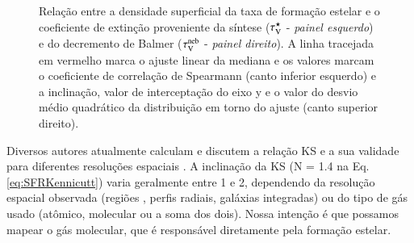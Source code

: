 \begin{figure}
	\centering
	\caption[Nossa {\em pseudo-KS}.]
	{Relação entre a densidade superficial da taxa de formação estelar e o coeficiente de extinção
proveniente da síntese ($\tau_{\mathrm{V}}^\star$ - {\em painel esquerdo}) e do decremento de Balmer ($\tau_{\mathrm{V}}^{\mathrm{neb}}$ -
{\em painel direito}). A linha tracejada em vermelho marca o ajuste linear da mediana e os
valores marcam o coeficiente de correlação de Spearmann (canto inferior esquerdo) e a
inclinação, valor de interceptação do eixo y e o valor do desvio médio quadrático da distribuição em
torno do ajuste (canto superior direito).}
	\label{fig:pseudoKS}
\end{figure}

Diversos autores atualmente calculam e discutem a relação KS e a sua validade para diferentes
resoluções espaciais \citep[e.g., ][]{Kennicutt.etal.2007a, Leroy.etal.2012a,
Calzetti.Liu.Koda.2012a, Lada.etal.2013a, Tacconi.etal.2013a, Casasola.etal.2015a}. A inclinação
da KS (N = 1.4 na Eq. \ref{eq:SFRKennicutt}) varia geralmente entre 1 e 2, dependendo da resolução
espacial observada (regiões \Hii, perfis radiais, galáxias integradas) ou do tipo de gás usado
(atômico, molecular ou a soma dos dois). Nossa intenção é que possamos mapear o gás molecular, que é
responsável diretamente pela formação estelar. 

